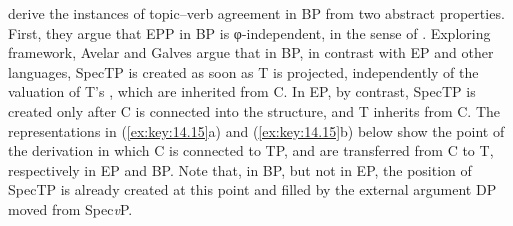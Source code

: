 \documentclass[output=paper]{langsci/langscibook}
\begin{document}
\textcite{AvelarGalves2011,AvelarGalves2016} derive the instances of
topic--verb agreement in \gls{BP} from two
abstract properties. First, they argue that \gls{EPP} in \gls{BP} is
φ-independent, in the sense of \citet{Holmberg2010}. Exploring
 framework, Avelar and Galves argue that in BP, in
contrast with \gls{EP} and other  languages, SpecTP is created as soon
as T is projected, independently of the valuation of T’s , which are
inherited from C. In EP, by contrast, SpecTP is created only after C is
connected into the structure, and T inherits  from C.  The
representations in (\ref{ex:key:14.15}a) and (\ref{ex:key:14.15}b) below show
the point of the derivation in which C is connected to TP, and  are
transferred from C to T, respectively in \gls{EP} and BP.  Note that, in BP,
but not in EP, the position of SpecTP is already created at this point and
filled by the external argument DP moved from Spec\emph{v}P.
\end{document}
